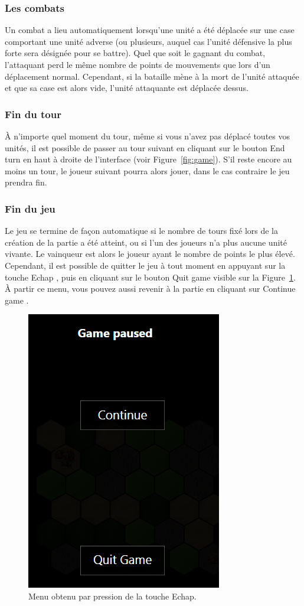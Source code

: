\subsubsection{Les combats}

Un combat a lieu automatiquement lorsqu'une unité a été déplacée sur une case comportant une unité adverse (ou plusieurs, auquel cas l'unité défensive la plus forte sera désignée pour se battre). Quel que soit le gagnant du combat, l'attaquant perd le même nombre de points de mouvements que lors d'un déplacement normal. Cependant, si la bataille mène à la mort de l'unité attaquée et que sa case est alors vide, l'unité attaquante est déplacée dessus.

\subsubsection{Fin du tour}

À n'importe quel moment du tour, même si vous n'avez pas déplacé toutes vos unités, il est possible de passer au tour suivant en cliquant sur le bouton \og End turn \fg{} en haut à droite de l'interface (voir {\sc Figure}~\ref{fig:game}). S'il reste encore au moins un tour, le joueur suivant pourra alors jouer, dans le cas contraire le jeu prendra fin.

\subsubsection{Fin du jeu}

Le jeu se termine de façon automatique si le nombre de tours fixé lors de la création de la partie a été atteint, ou si l'un des joueurs n'a plus aucune unité vivante. Le vainqueur est alors le joueur ayant le nombre de points le plus élevé. Cependant, il est possible de quitter le jeu à tout moment en appuyant sur la touche \og Echap \fg{}, puis en cliquant sur le bouton \og Quit game \fg{} visible sur la {\sc Figure}~\ref{fig:echap}. À partir ce menu, vous pouvez aussi revenir à la partie en cliquant sur \og Continue game \fg{}.

\begin{figure}
    \centering
    \includegraphics[height=0.70\textwidth]{figure/echap.png}
    \caption{Menu obtenu par pression de la touche Echap.}
    \label{fig:echap}
\end{figure}